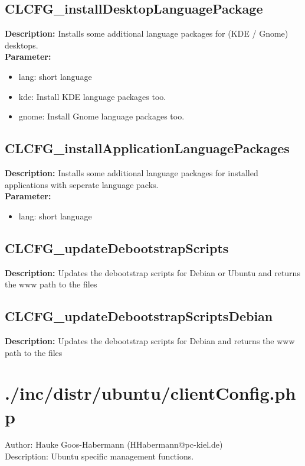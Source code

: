 \subsection{CLCFG\_installDesktopLanguagePackage}
\textbf{Description:} Installs some additional language packages for (KDE / Gnome) desktops.\\
\textbf{Parameter:}
\begin{itemize}
\item lang: short language
\item kde: Install KDE language packages too.
\item gnome: Install Gnome language packages too.
\end{itemize}

\subsection{CLCFG\_installApplicationLanguagePackages}
\textbf{Description:} Installs some additional language packages for installed applications with seperate language packs.\\
\textbf{Parameter:}
\begin{itemize}
\item lang: short language
\end{itemize}

\subsection{CLCFG\_updateDebootstrapScripts}
\textbf{Description:} Updates the debootstrap scripts for Debian or Ubuntu and returns the www path to the files\\

\subsection{CLCFG\_updateDebootstrapScriptsDebian}
\textbf{Description:} Updates the debootstrap scripts for Debian and returns the www path to the files\\

\newpage\section{./inc/distr/ubuntu/clientConfig.php}
 Author: Hauke Goos-Habermann (HHabermann@pc-kiel.de)\\
 Description: Ubuntu specific management functions.\\

